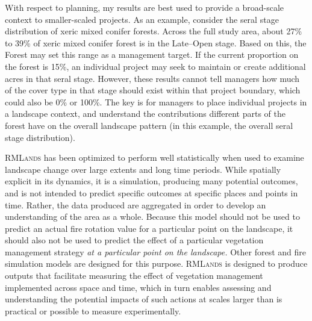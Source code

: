 With respect to planning, my results are best used to provide a broad-scale context to smaller-scaled projects. As an example, consider the seral stage distribution of xeric mixed conifer forests. Across the full study area, about 27\% to 39\% of xeric mixed conifer forest is in the Late--Open stage. Based on this, the Forest may set this range as a management target. If the current proportion on the forest is 15\%, an individual project may seek to maintain or create additional acres in that seral stage. However, these results cannot tell managers how much of the cover type in that stage should exist within that project boundary, which could also be 0\% or 100\%. The key is for managers to place individual projects in a landscape context, and understand the contributions different parts of the forest have on the overall landscape pattern (in this example, the overall seral stage distribution).

\textsc{RMLands} has been optimized to perform well statistically when used to examine landscape change over large extents and long time periods. While spatially explicit in its dynamics, it is a simulation, producing many potential outcomes, and is not intended to predict specific outcomes at specific places and points in time. Rather, the data produced are aggregated in order to develop an understanding of the area as a whole. Because this model should not be used to predict an actual fire rotation value for a particular point on the landscape, it should also not be used to predict the effect of a particular vegetation management strategy \emph{at a particular point on the landscape.} Other forest and fire simulation models are designed for this purpose. \textsc{RMLands} is designed to produce outputs that facilitate measuring the effect of vegetation management implemented across space and time, which in turn enables assessing and understanding the potential impacts of such actions at scales larger than is practical or possible to measure experimentally.  

